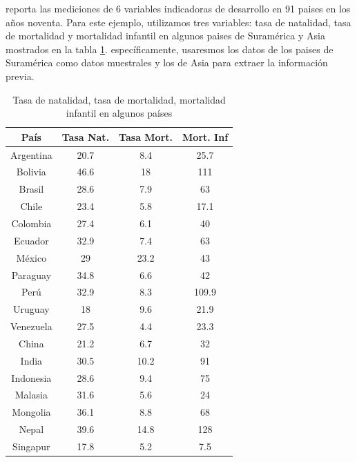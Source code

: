 \documentclass[10pt,openright]{book}\usepackage[]{graphicx}\usepackage[]{color}
\begin{document}
\begin{Eje}
 reporta las mediciones de 6 variables indicadoras de desarrollo en 91 paises en los a\~nos noventa. Para este ejemplo, utilizamos tres variables: tasa de natalidad, tasa de mortalidad y mortalidad infantil en algunos paises de Suram\'erica y Asia mostrados en la tabla \ref{Natalidad}. espec\'ificamente, usaresmos los datos de los paises de Suram\'erica como datos muestrales y los de Asia para extraer la informaci\'on previa.
\begin{table}[!htb]\centering
\begin{tabular}{cccc}\hline
Pa\'is&Tasa Nat.&Tasa Mort.&Mort. Inf\\\hline
Argentina&20.7&8.4&25.7\\
Bolivia&46.6&18&111\\
Brasil&28.6&7.9&63\\
Chile&23.4&5.8&17.1\\
Colombia&27.4&6.1&40\\
Ecuador&32.9&7.4&63\\
M\'exico&29&23.2&43\\
Paraguay&34.8&6.6&42\\
Per\'u&32.9&8.3&109.9\\
Uruguay&18&9.6&21.9\\
Venezuela&27.5&4.4&23.3\\
China&21.2&6.7&32\\
India&30.5&10.2&91\\
Indonesia&28.6&9.4&75\\
Malasia&31.6&5.6&24\\
Mongolia&36.1&8.8&68\\
Nepal&39.6&14.8&128\\
Singapur&17.8&5.2&7.5\\\hline
\end{tabular}
\caption{Tasa de natalidad, tasa de mortalidad, mortalidad infantil en algunos pa\'ises}\label{Natalidad}
\end{table}


\end{Eje}
\end{document}
